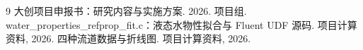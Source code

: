 \documentclass[stage2,fontset=fandol]{ydzjreport}
\begin{document}
\begin{thebibliography}{9}
 大创项目申报书：研究内容与实施方案. 2026.
 项目组. water\_properties\_refprop\_fit.c：液态水物性拟合与 Fluent UDF 源码. 项目计算资料, 2026.
 四种流道数据与折线图. 项目计算资料, 2026.
\end{thebibliography}
\end{document}
